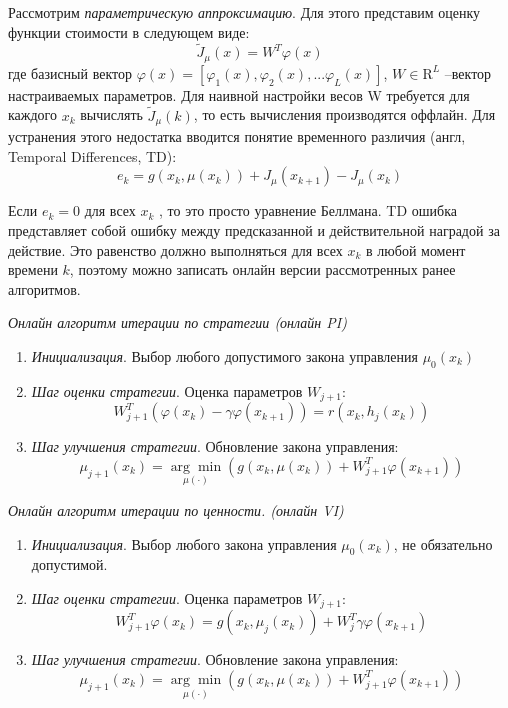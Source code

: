Рассмотрим \textit{параметрическую аппроксимацию}. Для этого представим оценку функции стоимости в следующем виде:
\begin{equation*}
	\label{f:approx_val_funt}
	\widetilde{J}_\mu(x) = W^T\varphi(x)
\end{equation*}
где базисный вектор $\varphi(x) = [\varphi_1(x), \varphi_2(x), ... \varphi_L(x)]$, $W \in \mathrm{R}^L$ --вектор настраиваемых параметров. Для наивной настройки весов W
требуется для каждого $x_k$ вычислять $\widetilde{J}_\mu(k)$, то есть вычисления производятся оффлайн. Для устранения этого недостатка вводится понятие временного различия (англ, Temporal Differences, TD):
\begin{equation*}
	e_k = g(x_k,\mu(x_k)) + J_{\mu}(x_{k+1}) - J_{\mu}(x_k)
\end{equation*}

Если $e_k = 0$ для всех $x_k$ , то это просто уравнение Беллмана. TD ошибка представляет собой ошибку между предсказанной и действительной наградой за действие. Это равенство должно выполняться для всех $x_k$ в любой
момент времени $k$, поэтому можно записать онлайн версии рассмотренных ранее алгоритмов.

\textit{Онлайн алгоритм итерации по стратегии (онлайн PI)}

\begin{enumerate} [1.]
	\item \textit{Инициализация}. Выбор любого допустимого закона управления $\mu_0(x_k)$
	\item \textit{Шаг оценки стратегии}. Оценка параметров $W_{j+1}$:
	\begin{equation*}
		\label{f:policy_iteration_online}
		W^T_{j+1}(\varphi(x_k) - \gamma \varphi(x_{k+1})) = r(x_k, h_j(x_k))
	\end{equation*}
	\item  \textit{Шаг улучшения стратегии}. Обновление закона управления:
	\begin{equation*}
		\mu_{j+1}(x_k) = \underset{\mu(\cdot)}{\arg\min}(g(x_k, \mu(x_k)) + W^T_{j+1}\varphi(x_{k+1}))
	\end{equation*}
\end{enumerate}


\textit{Онлайн алгоритм итерации по ценности. (онлайн VI)}
\begin{enumerate} [1.]
	\item \textit{Инициализация}. Выбор любого закона управления $\mu_0(x_k)$, не обязательно допустимой.
	\item  \textit{Шаг оценки стратегии}. Оценка параметров $W_{j+1}$:
	\begin{equation}
	\label{f:value_iteration_online}
	W^T_{j+1}\varphi(x_k) =g(x_k, \mu_j(x_k)) + W^T_{j}\gamma \varphi(x_{k+1})
	\end{equation}
	\item  \textit{Шаг улучшения стратегии}. Обновление закона управления:
	\begin{equation*}
		\mu_{j+1}(x_k) = \underset{\mu(\cdot)}{\arg\min}(g(x_k, \mu(x_k)) + W^T_{j+1}\varphi(x_{k+1}))
	\end{equation*}
\end{enumerate}


